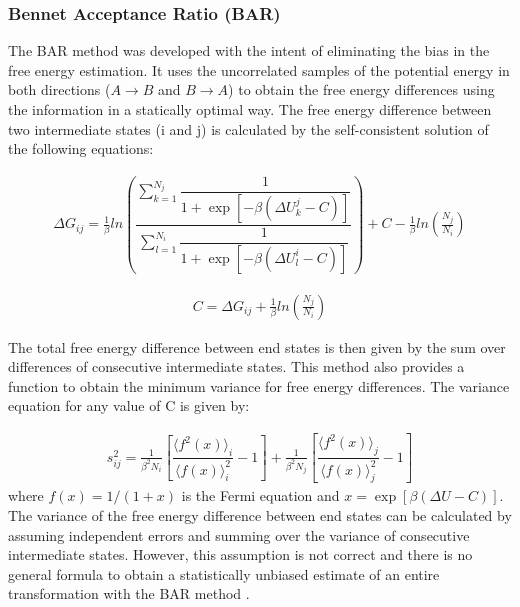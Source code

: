 \subsubsection{Bennet Acceptance Ratio (BAR)}

The BAR method \cite{bennet1976} was developed with the intent of eliminating the bias in the free energy estimation. It uses the uncorrelated samples of the potential energy in both directions ($A \rightarrow B$ and $B \rightarrow A$) to obtain the free energy differences using the information in a statically optimal way. The free energy difference between two intermediate states (i and j) is calculated by the self-consistent solution of the following equations: 

\begin{equation}
\label{eq:bar1}
\begin{aligned}
\Delta G_{ij} = \frac{1}{\beta} ln \left( \dfrac{\sum_{k=1}^{N_{j}} \dfrac{1}{1+\exp[-\beta(\Delta U_{k}^{j}-C)]}}{\sum_{l=1}^{N_{i}} \dfrac{1}{1+\exp[-\beta(\Delta U_{l}^{i}-C)]}}\right) + C - \frac{1}{\beta}ln\left(\frac{N_{j}}{N_{i}}\right)
\end{aligned}
\end{equation}

\begin{equation}
\label{eq:bar2}
\begin{aligned}
C = \Delta G_{ij} + \frac{1}{\beta}ln\left(\frac{N_{j}}{N_{i}}\right)
\end{aligned}
\end{equation}

The total free energy difference between end states is then given by the sum over differences of consecutive intermediate states. This method also provides a function to obtain the minimum variance for free energy differences. The variance equation for any value of C is given by:

\begin{equation}
\label{eq:barvar}
\begin{aligned}
s_{ij}^{2} = \frac{1}{\beta^{2} N_{i}} \left[\dfrac{\langle{f^{2}(x)}\rangle_{i}}{\langle{f(x)}\rangle^{2}_{i}} - 1\right] + \frac{1}{\beta^{2} N_{j}} \left[\dfrac{\langle{f^{2}(x)}\rangle_{j}}{\langle{f(x)}\rangle^{2}_{j}} - 1\right]
\end{aligned}
\end{equation}
where $f(x)=1/(1+x)$ is the Fermi equation and $x=\exp[\beta(\Delta U - C)]$. The variance of the free energy difference between end states can be calculated by assuming independent errors and summing over the variance of consecutive intermediate states. However, this assumption is not correct and there is no general formula to obtain a statistically unbiased estimate of an entire transformation with the BAR method \cite{bareva}. 

